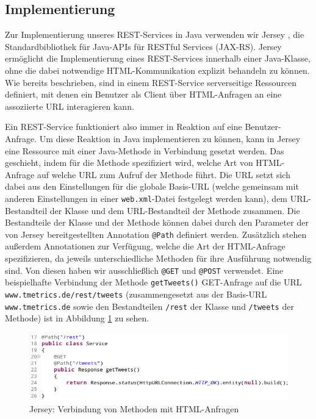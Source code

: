 \subsection{Implementierung}

Zur Implementierung unseres REST-Services in Java verwenden wir Jersey \cite{Jersey}, die Standardbibliothek für Java-APIs für RESTful Services (JAX-RS). Jersey ermöglicht die Implementierung eines REST-Services innerhalb einer Java-Klasse, ohne die dabei notwendige HTML-Kommunikation explizit behandeln zu können. Wie bereits beschrieben, sind in einem REST-Service serverseitige Ressourcen definiert, mit denen ein Benutzer als Client über HTML-Anfragen an eine assoziierte URL interagieren kann.

Ein REST-Service funktioniert also immer in Reaktion auf eine Benutzer-Anfrage. Um diese Reaktion in Java implementieren zu können, kann in Jersey eine Ressource mit einer Java-Methode in Verbindung gesetzt werden. Das geschieht, indem für die Methode spezifiziert wird, welche Art von HTML-Anfrage auf welche URL zum Aufruf der Methode führt. Die URL setzt sich dabei aus den Einstellungen für die globale Basis-URL (welche gemeinsam mit anderen Einstellungen in einer \texttt{web.xml}-Datei festgelegt werden kann), dem URL-Bestandteil der Klasse und dem URL-Bestandteil der Methode zusammen. Die Bestandteile der Klasse und der Methode können dabei durch den Parameter der von Jersey bereitgestellten Annotation \texttt{@Path} definiert werden. Zusätzlich stehen außerdem Annotationen zur Verfügung, welche die Art der HTML-Anfrage spezifizieren, da jeweils unterschiedliche Methoden für ihre Ausführung notwendig sind. Von diesen haben wir ausschließlich \texttt{@GET} und \texttt{@POST} verwendet. Eine beispielhafte Verbindung der Methode \texttt{getTweets()} GET-Anfrage auf die URL \texttt{www.tmetrics.de/rest/tweets} (zusammengesetzt aus der Basis-URL \texttt{www.tmetrics.de} sowie den Bestandteilen \texttt{/rest} der Klasse und \texttt{/tweets} der Methode) ist in Abbildung \ref{jerseyurl} zu sehen.

\begin{figure}[h]
\centering
\includegraphics[scale=0.6]{Bilder/REST/JerseyURL.png}
\caption{Jersey: Verbindung von Methoden mit HTML-Anfragen}
\label{jerseyurl}
\end{figure}

